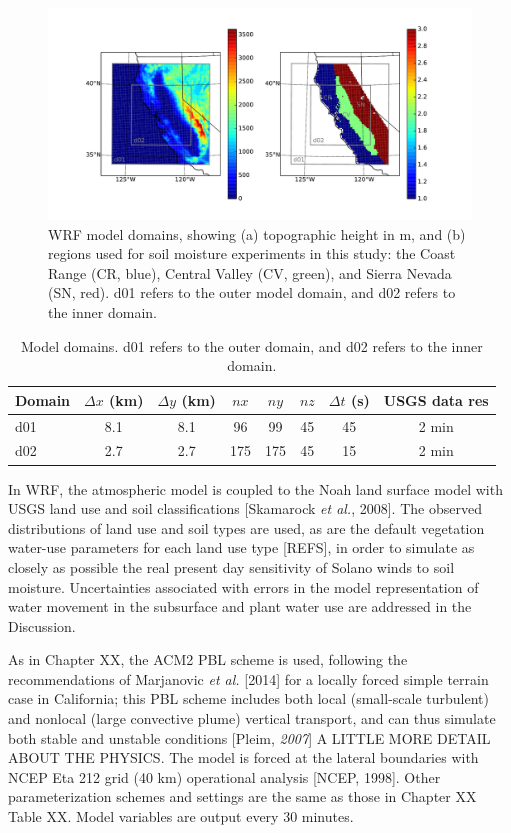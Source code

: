 \begin{figure}[here]
\includegraphics[width=1\textwidth]{ch3-wind/img/domain_map.pdf}
\caption{WRF model domains, showing (a) topographic height in m, and (b) regions used for soil moisture experiments in this study: the Coast Range (CR, blue), Central Valley (CV, green), and Sierra Nevada (SN, red). d01 refers to the outer model domain, and d02 refers to the inner domain.}
\label{fig:windSol_domainmap}
\end{figure}

\begin{table}
\begin{tabular}{ l c c c c c c c }
\hline
Domain & $\Delta x$ (km) & $\Delta y$ (km) & $nx$ & $ny$ & $nz$ & $\Delta t$ (s) & USGS data res \\ \hline
d01 & 8.1 & 8.1 & 96 & 99 & 45 & 45 & 2 min\\
d02 & 2.7 & 2.7 & 175 & 175 & 45 & 15 & 2 min\\
\hline
\end{tabular}
\caption{Model domains. d01 refers to the outer domain, and d02 refers to the inner domain.}
\label{table:windSol_domains}
\end{table}

In WRF, the atmospheric model is coupled to the Noah land surface model with USGS land use and soil classifications [Skamarock \textit{et al.}, 2008].  The observed distributions of land use and soil types are used, as are the default vegetation water-use parameters for each land use type [REFS], in order to simulate as closely as possible the real present day sensitivity of Solano winds to soil moisture.  Uncertainties associated with errors in the model representation of water movement in the subsurface and plant water use are addressed in the Discussion. 

As in Chapter XX, the ACM2 PBL scheme is used, following the recommendations of Marjanovic \textit{et al.} [2014] for a locally forced simple terrain case in California; this PBL scheme includes both local (small-scale turbulent) and nonlocal (large convective plume) vertical transport, and can thus simulate both stable and unstable conditions [Pleim, \textit{2007}] A LITTLE MORE DETAIL ABOUT THE PHYSICS.  The model is forced at the lateral boundaries with NCEP Eta 212 grid (40 km) operational analysis [NCEP, 1998].  Other parameterization schemes and settings are the same as those in Chapter XX Table XX.  Model variables are output every 30 minutes.

